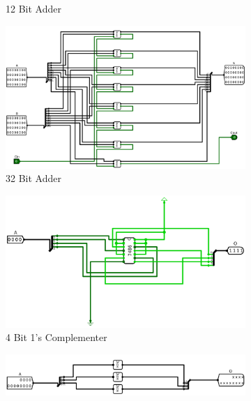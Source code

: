 \documentclass[12pt]{article}
\begin{document}
\begin{figure}[H]
\begin{subfigure}[b]{0.3\textwidth}
        \caption{12 Bit Adder}
        \label{fig:12bitadder}
    \end{subfigure}
    \begin{subfigure}[b]{0.3\textwidth}
        \includegraphics[width=\textwidth]{Images/32Adder.png}
        \caption{32 Bit Adder}
        \label{fig:32bitadder}
    \end{subfigure}
    \newline
    \newline
    \begin{subfigure}[b]{0.3\textwidth}
        \includegraphics[width=\textwidth]{Images/1Compl4.png}
        \caption{4 Bit 1's Complementer}
        \label{fig:4bitcompl}
    \end{subfigure}
    \begin{subfigure}[b]{0.3\textwidth}
        \includegraphics[width=\textwidth]{Images/1Compl12.png}

\end{subfigure}
\end{figure}
\end{document}
